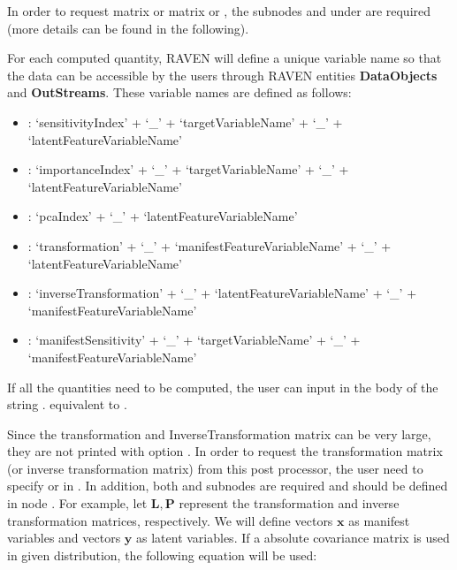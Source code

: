 \begin{itemize}
\begin{itemize}
    \nb In order to request  matrix or  matrix or ,
    the subnodes  and  under  are required (more details can be found in the following).
  \end{itemize}
  \nb For each computed quantity, RAVEN will define a unique variable name so that the data can be accessible by the users
  through RAVEN entities \textbf{DataObjects} and \textbf{OutStreams}. These variable names are defined as follows:
  \begin{itemize}
    \item {}: `sensitivityIndex' + `\_' + `targetVariableName' + `\_' + `latentFeatureVariableName'
    \item {}: `importanceIndex' + `\_' + `targetVariableName' + `\_' + `latentFeatureVariableName'
    \item {}: `pcaIndex' + `\_' + `latentFeatureVariableName'
    \item {}: `transformation' + `\_' + `manifestFeatureVariableName' + `\_' + `latentFeatureVariableName'
    \item {}: `inverseTransformation' + `\_' + `latentFeatureVariableName' + `\_' + `manifestFeatureVariableName'
    \item {}: `manifestSensitivity' + `\_' + `targetVariableName' + `\_' + `manifestFeatureVariableName'
  \end{itemize}
  If all the quantities need to be computed, the user can input in the body of  the string .
  \nb {} equivalent to .

  Since the transformation and InverseTransformation matrix can be very large, they are not printed with option .
  In order to request the transformation matrix (or inverse transformation matrix) from this post processor,
  the user need to specify  or  in . In addition,
  both   and  subnodes are required and should be defined in node . For example, let $\mathbf{L, P}$ represent
  the transformation and inverse transformation matrices, respectively. We will define vectors $\mathbf x$ as manifest variables and vectors $\mathbf y$
  as latent variables. If a absolute covariance matrix is used in given distribution, the following equation will be used:


\end{itemize}
